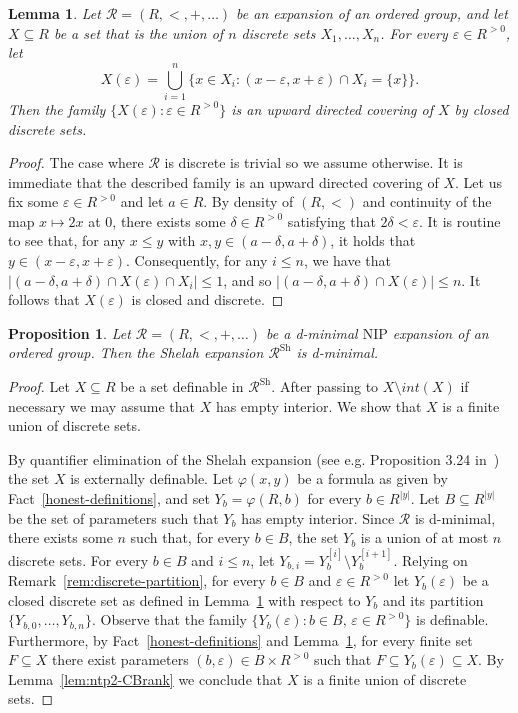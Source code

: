\documentclass[12pt]{article}
\newcommand{\Rr}{\mathcal{R}}
\newcommand{\Rshe}{\Rr^{\text{Sh}}}
\newcommand{\NIP}{\ensuremath{\mathrm{NIP}}}
\newtheorem{lemma}[theorem]{Lemma}
\newtheorem{proposition}[theorem]{Proposition}
\theoremstyle{definition}
\theoremstyle{remark}
\begin{document}
\begin{lemma}\label{lem:discrete-covering}
Let $\Rr=(R,<,+,\ldots)$ be an expansion of an ordered group, and let $X\subseteq R$ be a set that is the union of $n$ discrete sets $X_1,\ldots, X_n$. For every $\varepsilon\in R^{>0}$, let
\[
X(\varepsilon)=\bigcup_{i=1}^n \{ x\in X_i : (x-\varepsilon, x+\varepsilon) \cap X_i = \{x\} \}. 
\]
Then the family $\{ X(\varepsilon) : \varepsilon\in R^{>0}\}$ is an upward directed covering of $X$ by closed discrete sets. 
\end{lemma}
\begin{proof}
The case where $\Rr$ is discrete is trivial so we assume otherwise. 
It is immediate that the described family is an upward directed covering of $X$. Let us fix some $\varepsilon \in R^{>0}$ and let $a\in R$. By density of $(R,<)$ and continuity of the map $x\mapsto 2x$ at $0$, there exists some $\delta\in R^{>0}$ satisfying that $2\delta<\varepsilon$. It is routine to see that, for any $x \leq y$ with $x,y\in (a-\delta, a+\delta)$, it holds that $y\in (x-\varepsilon, x+\varepsilon)$. Consequently, for any $i\leq n$, we have that $|(a-\delta, a+\delta) \cap X(\varepsilon) \cap X_i|\leq 1$, and so $|(a-\delta, a+\delta) \cap X(\varepsilon)|\leq n$. It follows that $X(\varepsilon)$ is closed and discrete. 
\end{proof}

\begin{proposition} \label{prop:shelah-d-min}
Let $\Rr=(R,<,+,\ldots)$ be a d-minimal $\NIP$ expansion of an ordered group. Then the Shelah expansion $\Rshe$ is d-minimal. 
\end{proposition}
\begin{proof}
Let $X\subseteq R$ be a set definable in $\Rshe$. After passing to $X\setminus int(X)$ if necessary we may assume that $X$ has empty interior. We show that $X$ is a finite union of discrete sets. 

By quantifier elimination of the Shelah expansion (see e.g. Proposition 3.24 in~\cite{simon:guide-NIP}) the set $X$ is externally definable. Let $\varphi(x,y)$ be a formula as given by Fact~\ref{honest-definitions}, and set $Y_b=\varphi(R,b)$ for every $b\in R^{|y|}$. Let $B\subseteq R^{|y|}$ be the set of parameters such that $Y_b$ has empty interior. 
Since $\Rr$ is d-minimal, there exists some $n$ such that, for every $b\in B$, the set $Y_b$ is a union of at most $n$ discrete sets. For every $b\in B$ and $i\leq n$, let $Y_{b,i}=Y_b^{[i]} \setminus Y_b^{[i+1]}$. Relying on Remark~\ref{rem:discrete-partition}, for every $b\in B$ and $\varepsilon\in R^{>0}$ let $Y_b(\varepsilon)$ be a closed discrete set as defined in Lemma~\ref{lem:discrete-covering} with respect to $Y_b$ and its partition $\{ Y_{b,0}, \ldots, Y_{b,n}\}$. Observe that the family $\{ Y_{b}(\varepsilon) : b\in B, \, \varepsilon\in R^{>0}\}$ is definable. Furthermore, by Fact~\ref{honest-definitions} and Lemma~\ref{lem:discrete-covering}, for every finite set $F\subseteq X$ there exist parameters $(b,\varepsilon)\in B\times R^{>0}$ such that $F\subseteq Y_{b}(\varepsilon) \subseteq X$. By Lemma~\ref{lem:ntp2-CBrank} we conclude that $X$ is a finite union of discrete sets.
\end{proof}
\end{document}
